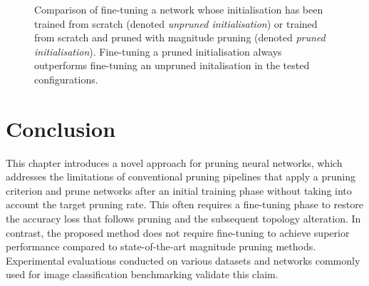 \begin{figure}
  \caption{ Comparison of fine-tuning a network whose initialisation has been
    trained from scratch (denoted \emph{unpruned initialisation}) or trained from
    scratch and pruned with magnitude pruning (denoted \emph{pruned
      initialisation}). Fine-tuning a pruned initialisation always outperforms
    fine-tuning an unpruned initalisation in the tested configurations.}
  \label{fig:chap1:finetuning_with_init_not_pruned}

\end{figure}




\section{Conclusion}
\label{sec:chap1:conclusion}


This chapter introduces a novel approach for pruning neural networks, which
addresses the limitations of conventional pruning pipelines that apply a pruning
criterion and prune networks after an initial training phase without taking into
account the target pruning rate. This often requires a fine-tuning phase to
restore the accuracy loss that follows pruning and the subsequent topology
alteration. In contrast, the proposed method does not require fine-tuning to
achieve superior performance compared to state-of-the-art magnitude pruning
methods. Experimental evaluations conducted on various datasets and networks
commonly used for image classification benchmarking validate this claim.\\

